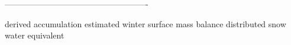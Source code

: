 \documentclass[twocolumn,letterpaper]{igs}
\begin{document}
----------------------------------------------------

derived accumulation
estimated winter surface mass balance
distributed snow water equivalent







\end{document}
